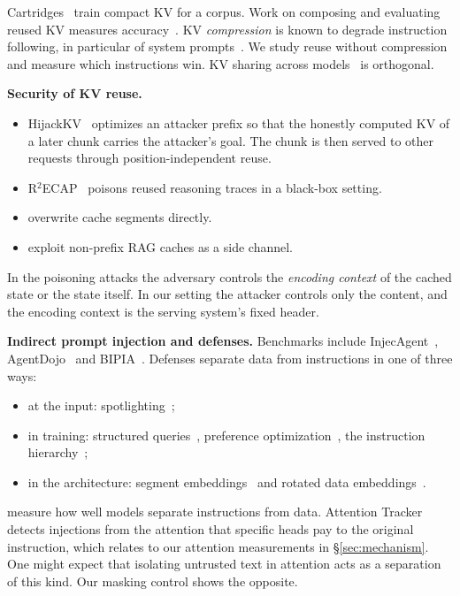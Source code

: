\documentclass[10pt]{article}
\begin{document}
Cartridges~\citep{eyuboglu2026cartridges} train compact KV for a corpus. Work on composing and evaluating reused KV measures
accuracy~\citep{shepard2026costs,rakotonirina2026where,cestola2026evaluating}. KV \emph{compression} is known to degrade instruction
following, in particular of system prompts~\citep{chen2026pitfalls}. We study reuse without compression and
measure which instructions win. KV sharing across models~\citep{liu2026droidspeak,fu2026c2c} is orthogonal.

\textbf{Security of KV reuse.}
\begin{itemize}
\item HijackKV~\citep{zhang2026hijackkv} optimizes an attacker prefix so that the honestly computed KV of a later chunk carries the
  attacker's goal. The chunk is then served to other requests through position-independent reuse.
\item R$^2$ECAP~\citep{zhu2026r2ecap} poisons reused reasoning traces in a black-box setting.
\item \citet{ganesh2025narrative} overwrite cache segments directly.
\item \citet{sun2026sidechannel} exploit non-prefix RAG caches as a side channel.
\end{itemize}
In the poisoning attacks the adversary controls the \emph{encoding context} of the cached state or the state itself. In our setting the
attacker controls only the content, and the encoding context is the serving system's fixed header.

\textbf{Indirect prompt injection and defenses.} Benchmarks include InjecAgent~\citep{zhan2024injecagent},
AgentDojo~\citep{debenedetti2024agentdojo} and BIPIA~\citep{yi2025bipia}. Defenses separate data from instructions in one of three
ways:
\begin{itemize}
\item at the input: spotlighting~\citep{hines2024spotlighting};
\item in training: structured queries~\citep{chen2025struq}, preference optimization~\citep{chen2025secalign,chen2025metasecalign},
  the instruction hierarchy~\citep{wallace2024hierarchy};
\item in the architecture: segment embeddings~\citep{wu2025ise} and rotated data embeddings~\citep{zverev2026aside}.
\end{itemize}
\citet{zverev2025separate} measure how well models separate instructions from data. Attention Tracker~\citep{hung2025attentiontracker}
detects injections from the attention that specific heads pay to the original instruction, which relates to our attention
measurements in \S\ref{sec:mechanism}. One might expect that isolating untrusted text in attention acts as a separation of this
kind. Our masking control shows the opposite.
\end{document}
